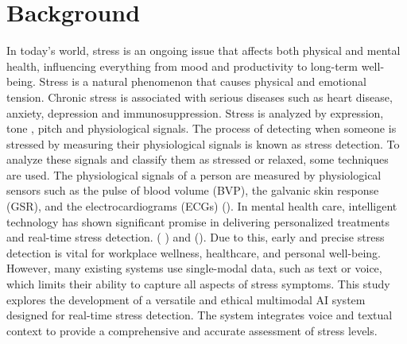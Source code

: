 \documentclass[Arial,12pt,openright,twoside]{book}
\begin{document}
  \section{Background}
  In today's world, stress is an ongoing issue that affects both physical and mental health, influencing everything from mood and productivity to long-term well-being. Stress is a natural phenomenon that causes physical and emotional tension. Chronic stress is associated with serious diseases such as heart disease, anxiety, depression and immunosuppression. Stress is analyzed by expression, tone , pitch and physiological signals. The process of detecting when someone is stressed by measuring their physiological signals is known as stress detection. To analyze these signals and classify them as stressed or relaxed, some techniques are used. The physiological signals of a person are measured by physiological sensors such as the pulse of blood volume (BVP), the galvanic skin response (GSR), and the electrocardiograms (ECGs) (\citet{sriramprakash2017}). In mental health care, intelligent technology has shown significant promise in delivering personalized treatments and real-time stress detection. (\cite{kafkova2024} ) and (\cite{liu2024}).  Due to this, early and precise stress detection is vital for workplace wellness, healthcare, and personal well-being. However, many existing systems use single-modal data, such as text or voice, which limits their ability to capture all aspects of stress symptoms. This study explores the development of a versatile and ethical multimodal AI system designed for real-time stress detection. The system integrates voice and textual context to provide a comprehensive and accurate assessment of stress levels.
\end{document}
